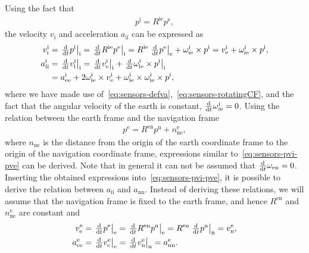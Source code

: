 Using the fact that
\begin{align}
p^\text{i} = R^\text{ie} p^\text{e},
\end{align} 
the velocity $v_\text{i}$ and acceleration $a_\text{ii}$ can be expressed as
\begin{subequations}
\label{eq:sensors-pvi-pve}
\begin{align}
v_\text{i}^\text{i} &= \left. \tfrac{\textrm{d}}{\textrm{d} t} p^\text{i} \right|_\text{i} = 
\left. \tfrac{\textrm{d}}{\textrm{d} t} R^\text{ie} p^\text{e} \right|_\text{i} = 
R^\text{ie} \left. \tfrac{\textrm{d}}{\textrm{d} t} p^\text{e} \right|_\text{e} + \omega_{\text{ie}}^\text{i} \times p^\text{i} 
= v^\text{i}_\text{e} + \omega_{\text{ie}}^\text{i} \times p^\text{i}, \\
a_\text{ii}^\text{i} &= \left. \tfrac{\textrm{d}}{\textrm{d} t} v^\text{i}_\text{i} \right|_\text{i} = 
\left. \tfrac{\textrm{d}}{\textrm{d} t} v^\text{i}_\text{e} \right|_\text{i} + \left. \tfrac{\textrm{d}}{\textrm{d} t} \omega_{\text{ie}}^\text{i} \times p^\text{i} \right|_\text{i} \nonumber \\
&= a^\text{i}_\text{ee} + 2 \omega_{\text{ie}}^\text{i} \times v^\text{i}_\text{e} + \omega_{\text{ie}}^\text{i} \times \omega_{\text{ie}}^\text{i} \times p^\text{i},
\end{align} 
\end{subequations}
where we have made use of~\eqref{eq:sensors-defva},~\eqref{eq:sensors-rotatingCF}, and the fact that the angular velocity of the earth is constant, \ie $\tfrac{\textrm{d}}{\textrm{d} t} \omega_{\text{ie}}^\text{i} = 0$. Using the relation between the earth frame and the navigation frame 
\begin{align}
p^\text{e} = R^\text{en} p^\text{n} + n_\text{ne}^\text{e},
\end{align} 
where $n_\text{ne}$ is the distance from the origin of the earth coordinate frame to the origin of the navigation coordinate frame, expressions similar to~\eqref{eq:sensors-pvi-pve} can be derived. Note that in general it can not be assumed that $\tfrac{\textrm{d}}{\textrm{d} t} \omega_{\text{en}} = 0$. Inserting the obtained expressions into~\eqref{eq:sensors-pvi-pve}, it is possible to derive the relation between $a_\text{ii}$ and $a_\text{nn}$. Instead of deriving these relations, we will assume that the navigation frame is fixed to the earth frame, and hence $R^\text{en}$ and $n_\text{ne}^\text{e}$ are constant and
\begin{subequations}
\label{eq:sensors-pve-pvn}
\begin{align}
v_\text{e}^\text{e} &=
\left. \tfrac{\textrm{d}}{\textrm{d} t} p^\text{e} \right|_\text{e} = 
\left. \tfrac{\textrm{d}}{\textrm{d} t} R^\text{en} p^\text{n} \right|_\text{e} = 
R^\text{en} \left. \tfrac{\textrm{d}}{\textrm{d} t} p^\text{n} \right|_\text{n} = 
v^\text{e}_\text{n}, \\
a_\text{ee}^\text{e} &=
\left. \tfrac{\textrm{d}}{\textrm{d} t} v^\text{e}_\text{e} \right|_\text{e} = 
\left. \tfrac{\textrm{d}}{\textrm{d} t} v^\text{e}_\text{n} \right|_\text{n} = 
a^\text{e}_\text{nn} .
\end{align} 
\end{subequations}
